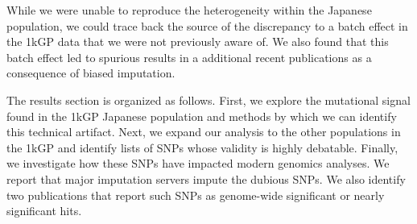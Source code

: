 \documentclass[9pt,lineno]{elife}
\begin{document}
While we were unable to reproduce the heterogeneity within the Japanese population, we could trace back the source of the discrepancy to a batch effect in the 1kGP data that we were not previously aware of.
We also found that this batch effect led to spurious results in a additional recent publications as a consequence of biased imputation.


The results section is organized as follows.
First, we explore the mutational signal found in the 1kGP Japanese population and methods by which we can identify this technical artifact.
Next, we expand our analysis to the other populations in the 1kGP and identify lists of SNPs whose validity is highly debatable.
Finally, we investigate how these SNPs have impacted modern genomics analyses. 
We report that major imputation servers impute the dubious SNPs. 
We also identify two publications that report such SNPs as genome-wide significant or nearly significant hits.   
\end{document}
